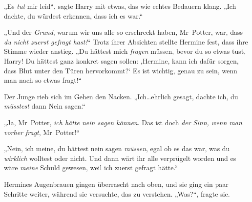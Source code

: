 „Es \emph{tut} mir leid“, sagte Harry mit etwas, das wie echtes Bedauern klang. „Ich dachte, du würdest erkennen, dass ich es war.“

„Und der \emph{Grund}, warum wir uns alle so erschreckt haben, Mr~Potter, war, dass \emph{du nicht zuerst gefragt hast!}“ Trotz ihrer Absichten stellte Hermine fest, dass ihre Stimme wieder anstieg. „Du hättest mich \emph{fragen} müssen, bevor du so etwas tust, Harry! Du hättest ganz konkret sagen sollen: ‚Hermine, kann ich dafür sorgen, dass Blut unter den Türen hervorkommt?‘ Es ist wichtig, genau zu sein, wenn man nach so etwas fragt!“

Der Junge rieb sich im Gehen den Nacken. „Ich…ehrlich gesagt, dachte ich, du \emph{müsstest} dann Nein sagen.“

„Ja, Mr~Potter, \emph{ich hätte nein sagen können}. Das ist doch \emph{der Sinn, wenn man vorher fragt}, Mr~Potter!“

„Nein, ich meine, du hättest nein sagen \emph{müssen}, egal ob es das war, was du \emph{wirklich} wolltest oder nicht. Und dann wärt ihr alle verprügelt worden und es wäre \emph{meine} Schuld gewesen, weil ich zuerst gefragt hätte.“

Hermines Augenbrauen gingen überrascht nach oben, und sie ging ein paar Schritte weiter, während sie versuchte, das zu verstehen. „Was?“, fragte sie.

